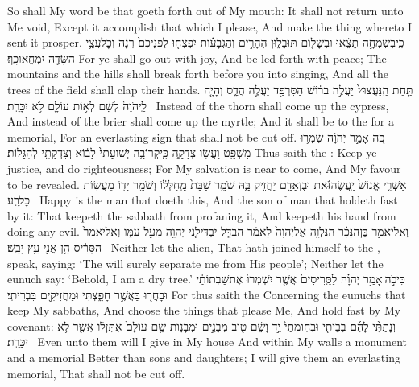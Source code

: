 {So shall My word be that goeth forth out of My mouth: It shall not return unto Me void, Except it accomplish that which I please, And make the thing whereto I sent it prosper.}
{כִּֽי\maqqaf בְשִׂמְחָ֣ה תֵצֵ֔אוּ וּבְשָׁל֖וֹם תּוּבָל֑וּן הֶהָרִ֣ים וְהַגְּבָע֗וֹת יִפְצְח֤וּ לִפְנֵיכֶם֙ רִנָּ֔ה וְכׇל\maqqaf עֲצֵ֥י הַשָּׂדֶ֖ה יִמְחֲאוּ\maqqaf כָֽף׃}
{For ye shall go out with joy, And be led forth with peace; The mountains and the hills shall break forth before you into singing, And all the trees of the field shall clap their hands.}
{תַּ֤חַת הַֽנַּעֲצוּץ֙ יַעֲלֶ֣ה בְר֔וֹשׁ  הַסִּרְפַּ֖ד יַעֲלֶ֣ה הֲדַ֑ס וְהָיָ֤ה לַֽיהֹוָה֙ לְשֵׁ֔ם לְא֥וֹת עוֹלָ֖ם לֹ֥א יִכָּרֵֽת׃ \petucha }
{Instead of the thorn shall come up the cypress, And instead of the brier shall come up the myrtle; And it shall be to the \lord\space for a memorial, For an everlasting sign that shall not be cut off.}
\newperek
{}
{כֹּ֚ה אָמַ֣ר יְהֹוָ֔ה שִׁמְר֥וּ מִשְׁפָּ֖ט וַעֲשׂ֣וּ צְדָקָ֑ה כִּֽי\maqqaf קְרוֹבָ֤ה יְשׁוּעָתִי֙ לָב֔וֹא וְצִדְקָתִ֖י לְהִגָּלֽוֹת׃}
{Thus saith the \lord: Keep ye justice, and do righteousness; For My salvation is near to come, And My favour to be revealed.}
{אַשְׁרֵ֤י אֱנוֹשׁ֙ יַֽעֲשֶׂה\maqqaf זֹּ֔את וּבֶן\maqqaf אָדָ֖ם יַחֲזִ֣יק בָּ֑הּ שֹׁמֵ֤ר שַׁבָּת֙ מֵֽחַלְּל֔וֹ וְשֹׁמֵ֥ר יָד֖וֹ מֵעֲשׂ֥וֹת כׇּל\maqqaf רָֽע׃ \setuma }
{Happy is the man that doeth this, And the son of man that holdeth fast by it: That keepeth the sabbath from profaning it, And keepeth his hand from doing any evil.}
{וְאַל\maqqaf יֹאמַ֣ר בֶּן\maqqaf הַנֵּכָ֗ר הַנִּלְוָ֤ה אֶל\maqqaf יְהֹוָה֙ לֵאמֹ֔ר הַבְדֵּ֧ל יַבְדִּילַ֛נִי יְהֹוָ֖ה מֵעַ֣ל עַמּ֑וֹ וְאַל\maqqaf יֹאמַר֙ הַסָּרִ֔יס הֵ֥ן אֲנִ֖י עֵ֥ץ יָבֵֽשׁ׃ \petucha }
{Neither let the alien, That hath joined himself to the \lord, speak, saying: ‘The \lord\space will surely separate me from His people’; Neither let the eunuch say: ‘Behold, I am a dry tree.’}
{כִּי\maqqaf כֹ֣ה \legarmeh  אָמַ֣ר יְהֹוָ֗ה לַסָּֽרִיסִים֙ אֲשֶׁ֤ר יִשְׁמְרוּ֙ אֶת\maqqaf שַׁבְּתוֹתַ֔י וּבָחֲר֖וּ בַּאֲשֶׁ֣ר חָפָ֑צְתִּי וּמַחֲזִיקִ֖ים בִּבְרִיתִֽי׃}
{For thus saith the \lord\space Concerning the eunuchs that keep My sabbaths, And choose the things that please Me, And hold fast by My covenant:}
{וְנָתַתִּ֨י לָהֶ֜ם בְּבֵיתִ֤י וּבְחֽוֹמֹתַי֙ יָ֣ד וָשֵׁ֔ם ט֖וֹב מִבָּנִ֣ים וּמִבָּנ֑וֹת שֵׁ֤ם עוֹלָם֙ אֶתֶּן\maqqaf ל֔וֹ אֲשֶׁ֖ר לֹ֥א יִכָּרֵֽת׃ \setuma }
{Even unto them will I give in My house And within My walls a monument and a memorial Better than sons and daughters; I will give them an everlasting memorial, That shall not be cut off.}
